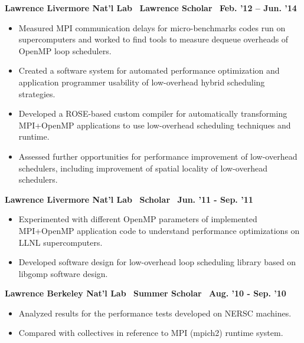 \textbf{Lawrence Livermore Nat’l Lab$\>$$\>$$\>$$\>$Lawrence Scholar$\>$$\>$$\>$$\>$Feb. '12 – Jun. '14}
\vspace*{-0.0in}
\begin{itemize} 
\item Measured MPI communication delays for micro-benchmarks codes run on supercomputers and worked to find tools to measure dequeue overheads of OpenMP loop schedulers.
\item Created a software system for automated performance optimization and application programmer usability of low-overhead hybrid scheduling
strategies.
\item Developed a ROSE-based custom compiler for automatically transforming MPI+OpenMP applications to use low-overhead scheduling
techniques and runtime.
\item Assessed further opportunities for performance improvement of low-overhead schedulers, including improvement of spatial locality
of low-overhead schedulers.
\end{itemize}

\textbf{Lawrence Livermore Nat’l Lab$\>$$\>$$\>$$\>$Scholar$\>$$\>$$\>$$\>$Jun. '11 - Sep. '11}
\vspace*{-0.0in}
\begin{itemize} 
\item Experimented with different OpenMP parameters of implemented MPI+OpenMP application code to understand performance optimizations on
LLNL supercomputers.
\item Developed software design for low-overhead loop scheduling library based on libgomp software design.
\end{itemize} 

\textbf{Lawrence Berkeley Nat’l Lab$\>$$\>$$\>$$\>$Summer Scholar$\>$$\>$$\>$$\>$Aug. '10 - Sep. '10}
\begin{itemize}
\item Analyzed results for the performance tests developed on NERSC machines.
\item Compared with collectives in reference to MPI (mpich2) runtime system.
\end{itemize}


